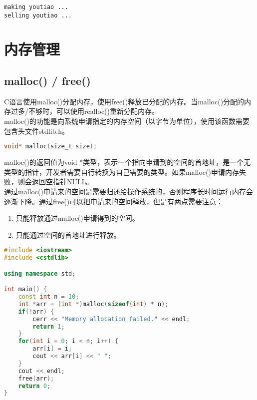 \begin{tcolorbox}
	\begin{verbatim}
making youtiao ...
selling youtiao ...
	\end{verbatim}
\end{tcolorbox}

\newpage

\section{内存管理}

\subsection{malloc() / free()}

C语言使用malloc()分配内存，使用free()释放已分配的内存。当malloc()分配的内存过多/不够时，可以使用realloc()重新分配内存。\\

malloc()的功能是向系统申请指定的内存空间（以字节为单位），使用该函数需要包含头文件stdlib.h。

\vspace{-0.5cm}

\begin{lstlisting}[language=C]
void* malloc(size_t size);
\end{lstlisting}

malloc()的返回值为void *类型，表示一个指向申请到的空间的首地址，是一个无类型的指针，开发者需要自行转换为自己需要的类型。如果malloc()申请内存失败，则会返回空指针NULL。\\

通过malloc()申请来的空间是需要归还给操作系统的，否则程序长时间运行内存会逐渐下降。通过free()可以把申请来的空间释放，但是有两点需要注意：

\begin{enumerate}
	\item 只能释放通过malloc()申请得到的空间。
	\item 只能通过空间的首地址进行释放。
\end{enumerate}

\vspace{0.5cm}


\begin{lstlisting}[language=C++]
#include <iostream>
#include <cstdlib>

using namespace std;

int main() {
    const int n = 10;
    int *arr = (int *)malloc(sizeof(int) * n);
    if(!arr) {
        cerr << "Memory allocation failed." << endl;
        return 1;
    }
    for(int i = 0; i < n; i++) {
        arr[i] = i;
        cout << arr[i] << " ";
    }
    cout << endl;
    free(arr);
    return 0;
}
\end{lstlisting}

